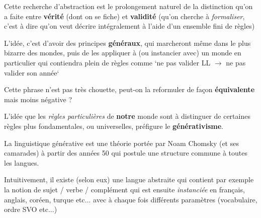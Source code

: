 \begin{frame}
	
Cette recherche d'abstraction est le prolongement naturel de la distinction qu'on a faite entre \textbf{vérité} (dont on se fiche) et \textbf{validité} (qu'on cherche à \textit{formaliser}, c'est à dire qu'on veut décrire intégralement à l'aide d'un ensemble fini de règles) \pause \newline 

L'idée, c'est d'avoir des principes \textbf{généraux}, qui marcheront même dans le plus bizarre des mondes, puis de les appliquer à (ou instancier avec) un monde en particulier qui contiendra plein de règles comme \newline `ne pas valider LL $\rightarrow$ ne pas valider son année` \pause \newline 

Cette phrase n'est pas très chouette, peut-on la reformuler de façon \textbf{équivalente} mais moins négative ?

\end{frame}

\begin{frame}
	
L'idée que les \textit{règles particulières} de \textbf{notre} monde sont à distinguer de certaines règles plus fondamentales, ou universelles, préfigure le \textbf{générativisme}. \newline \pause

La linguistique générative est une théorie portée par Noam Chomsky (et ses camarades) à partir des années 50 qui postule une structure commune à toutes les langues. \newline \pause

Intuitivement, il existe (selon eux) une langue abstraite qui contient par exemple la notion de sujet / verbe / complément qui est ensuite \textit{instanciée} en français, anglais, coréen, turque etc... avec à chaque fois différents paramètres (vocabulaire, ordre SVO etc...)


\end{frame}


